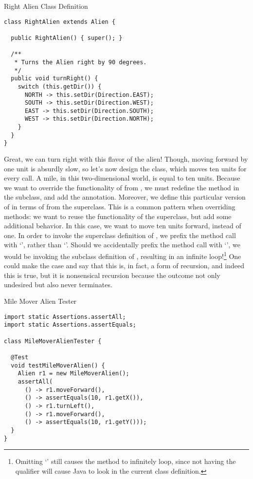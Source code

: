 \begin{cl}{Right Alien Class Definition}
\begin{lstlisting}[language=MyJava]
class RightAlien extends Alien {

  public RightAlien() { super(); }

  /**
   * Turns the Alien right by 90 degrees.
   */
  public void turnRight() {
    switch (this.getDir()) {
      NORTH -> this.setDir(Direction.EAST);
      SOUTH -> this.setDir(Direction.WEST);
      EAST -> this.setDir(Direction.SOUTH);
      WEST -> this.setDir(Direction.NORTH);
    }
  }
}
\end{lstlisting}
\end{cl}

Great, we can turn right with this flavor of the alien! Though, moving forward by one unit is absurdly slow, so let's now design the  class, which moves ten units for every  call. A mile, in this two-dimensional world, is equal to ten units. Because we want to override the functionality of  from , we must redefine the method in the subclass, and add the  annotation. Moreover, we define this particular version of  in terms of  from the superclass. This is a common pattern when overriding methods: we want to reuse the functionality of the superclass, but add some additional behavior. In this case, we want to move ten units forward, instead of one. In order to invoke the superclass definition of , we prefix the method call with `', rather than `'. Should we accidentally prefix the method call with `', we would be invoking the subclass definition of , resulting in an infinite loop!\footnote{Omitting `' still causes the method to infinitely loop, since not having the qualifier will cause Java to look in the current class definition.} One could make the case and say that this is, in fact, a form of recursion, and indeed this is true, but it is nonsensical recursion because the outcome not only undesired but also never terminates.

\begin{cl}{Mile Mover Alien Tester}
\begin{lstlisting}[language=MyJava]
import static Assertions.assertAll;
import static Assertions.assertEquals;

class MileMoverAlienTester {

  @Test
  void testMileMoverAlien() {
    Alien r1 = new MileMoverAlien();
    assertAll(
      () -> r1.moveForward(),
      () -> assertEquals(10, r1.getX()),
      () -> r1.turnLeft(),
      () -> r1.moveForward(),
      () -> assertEquals(10, r1.getY()));
  }
}
\end{lstlisting}
\end{cl}

